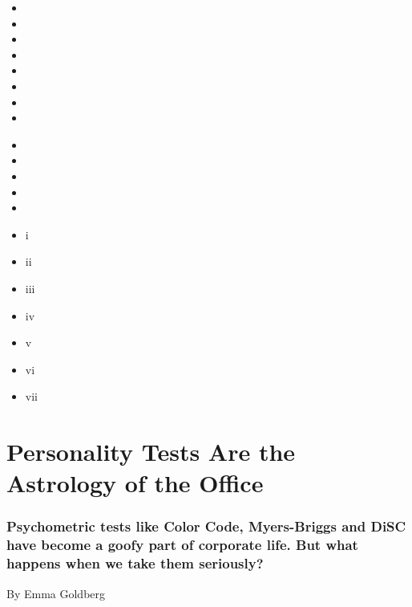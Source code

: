 \begin{itemize}
\item
\item
\item
\item
\item
\item
\item
\item
\end{itemize}

\begin{itemize}
\item
\item
\item
\item
\item
\end{itemize}

\begin{itemize}
\item
  i
\item
  ii
\item
  iii
\item
  iv
\item
  v
\item
  vi
\item
  vii
\end{itemize}

\href{https://www.nytimes.com/2019/09/17/style/personality-tests-office.html}{}

\hypertarget{personality-tests-are-the-astrology-of-the-office}{%
\section{Personality Tests Are the Astrology of the
Office}\label{personality-tests-are-the-astrology-of-the-office}}

\hypertarget{psychometric-tests-like-color-code-myers-briggs-and-disc-have-become-a-goofy-part-of-corporate-life-but-what-happens-when-we-take-them-seriously}{%
\subsubsection{Psychometric tests like Color Code, Myers-Briggs and DiSC
have become a goofy part of corporate life. But what happens when we
take them
seriously?}\label{psychometric-tests-like-color-code-myers-briggs-and-disc-have-become-a-goofy-part-of-corporate-life-but-what-happens-when-we-take-them-seriously}}

By Emma Goldberg

